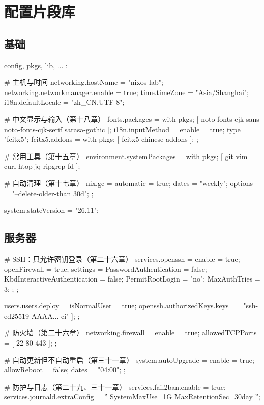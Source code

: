 \chapter{配置片段库}

\section{基础}

\begin{nixcode}
{
  config,
  pkgs,
  lib,
  ...
}:

{
  # 主机与时间
  networking.hostName = "nixos-lab";
  networking.networkmanager.enable = true;
  time.timeZone = "Asia/Shanghai";
  i18n.defaultLocale = "zh_CN.UTF-8";

  # 中文显示与输入（第十八章）
  fonts.packages = with pkgs; [
    noto-fonts-cjk-sans
    noto-fonts-cjk-serif
    sarasa-gothic
  ];
  i18n.inputMethod = {
    enable = true;
    type = "fcitx5";
    fcitx5.addons = with pkgs; [ fcitx5-chinese-addons ];
  };

  # 常用工具（第十五章）
  environment.systemPackages = with pkgs; [
    git
    vim
    curl
    htop
    jq
    ripgrep
    fd
  ];

  # 自动清理（第十七章）
  nix.gc = {
    automatic = true;
    dates = "weekly";
    options = "--delete-older-than 30d";
  };

  system.stateVersion = "26.11";
}
\end{nixcode}

\section{服务器}

\begin{nixcode}
{
  # SSH：只允许密钥登录（第二十六章）
  services.openssh = {
    enable = true;
    openFirewall = true;
    settings = {
      PasswordAuthentication = false;
      KbdInteractiveAuthentication = false;
      PermitRootLogin = "no";
      MaxAuthTries = 3;
    };
  };

  users.users.deploy = {
    isNormalUser = true;
    openssh.authorizedKeys.keys = [ "ssh-ed25519 AAAA... ci" ];
  };

  # 防火墙（第二十六章）
  networking.firewall = {
    enable = true;
    allowedTCPPorts = [
      22
      80
      443
    ];
  };

  # 自动更新但不自动重启（第三十一章）
  system.autoUpgrade = {
    enable = true;
    allowReboot = false;
    dates = "04:00";
  };

  # 防护与日志（第二十九、三十一章）
  services.fail2ban.enable = true;
  services.journald.extraConfig = ''
    SystemMaxUse=1G
    MaxRetentionSec=30day
  '';
}
\end{nixcode}

